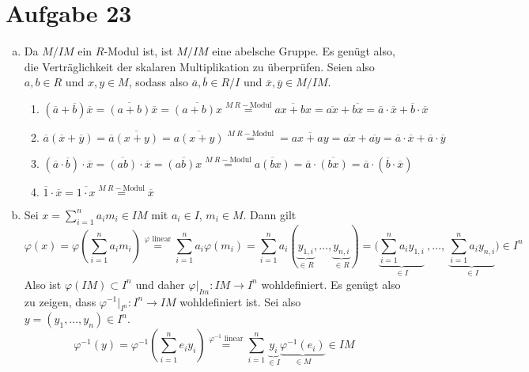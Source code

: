\documentclass{article}
\theoremstyle{definition}
\let\oldstackrel\stackrel
\renewcommand{\stackrel}[2]{%
    \oldstackrel{\mathclap{#1}}{#2}
}%
\begin{document}
\section*{Aufgabe 23}
\begin{enumerate}[(a)]
    \item Da $M/IM$ ein $R$-Modul ist, ist $M/IM$ eine abelsche Gruppe. Es genügt also, die Verträglichkeit der skalaren Multiplikation zu überprüfen. Seien also $a,b \in R$ und $x,y\in M$, sodass also $\overline{a}, \overline{b}\in R/I$ und $\overline{x}, \overline{y} \in M/IM$. 
    \begin{enumerate}[(1)]
        \item $(\overline{a} + \overline{b})\overline{x} = \overline{(a+b)}\overline{x} = \overline{(a+b)x}\oldstackrel{M\ R-\text{Modul}}{=} \overline{ax + bx} = \overline{ax} + \overline{bx} = \overline{a}\cdot \overline{x} + \overline{b} \cdot \overline{x}$
        \item $\overline{a}(\overline{x}+\overline{y}) = \overline{a}\overline{(x+y)} = \overline{a(x+y)} \oldstackrel{M\ R-\text{Modul}}{=} = \overline{ax + ay} = \overline{ax} + \overline{ay} = \overline{a}\cdot \overline{x} + \overline{a} \cdot \overline{y}$
        \item $(\overline{a}\cdot \overline{b}) \cdot \overline{x} = \overline{(ab)} \cdot \overline{x} = \overline{(ab) x} \oldstackrel{M\ R-\text{Modul}}{=} \overline{a(bx)} = \overline{a}\cdot \overline{(bx)} = \overline{a}\cdot (\overline{b}\cdot \overline{x})$
        \item $\overline{1}\cdot \overline{x} = \overline{1\cdot x} \oldstackrel{M\ R-\text{Modul}}{=} \overline{x}$
    \end{enumerate}
    \item %
    Sei $x = \sum_{i = 1}^{n}a_im_i \in IM$ mit $a_i \in I$, $m_i \in M$. Dann gilt \[\varphi(x) = \varphi\left(\sum_{i = 1}^{n}a_im_i\right)\oldstackrel{\varphi \text{ linear}}{=} \sum_{i = 1}^{n}a_i\varphi(m_i) = \sum_{i = 1}^{n}a_i(\underbrace{y_{1,i}}_{\in R}, \dots, \underbrace{y_{n,i}}_{\in R}) = \bigg(\underbrace{\sum_{i = 1}^{n}a_iy_{1,i}}_{\in I}\ ,\dots,\ \underbrace{\sum_{i = 1}^{n}a_iy_{n,i}}_{\in I}\bigg) \in I^n\]
    Also ist $\varphi(IM) \subset I^n$ und daher $\varphi|_{Im}\colon IM \to I^n$ wohldefiniert.
    Es genügt also zu zeigen, dass $\varphi^{-1}|_{I^n}\colon I^n \to IM$ wohldefiniert ist. Sei also $y = (y_1,\dots, y_n) \in I^n$. 
    \[\varphi^{-1}(y) = \varphi^{-1}\left(\sum_{i = 1}^{n}e_iy_i\right) \oldstackrel{\varphi^{-1} \text{ linear}}{=} \sum_{i = 1}^{n}\underbrace{y_i}_{\in I}\underbrace{\varphi^{-1}(e_i)}_{\in M} \in IM\]

\end{enumerate}
\end{document}
